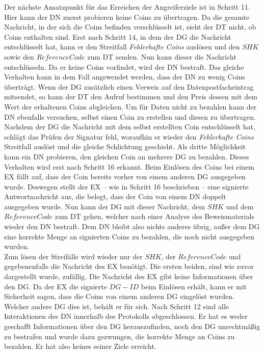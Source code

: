 \documentclass[
	fontsize=11pt,
	headings=small,
	parskip=half,           %
	bibliography=totoc,
	numbers=noenddot,       %
	open=any,               %
]{scrreprt}
\begin{document}
Der nächste Ansatzpunkt für das Erreichen der Angreiferziele ist in Schritt 11. Hier kann der DN zuerst probieren keine Coins zu übertragen. Da die gesamte Nachricht, in der sich die Coins befinden verschlüsselt ist, sieht der DT nicht, ob Coins enthalten sind. Erst nach Schritt 14, in dem der DG die Nachricht entschlüsselt hat, kann er den Streitfall \textit{Fehlerhafte Coins} auslösen und den $SHK$ sowie den $ReferenceCode$ zum DT senden. Nun kann dieser die Nachricht entschlüsseln. Da er keine Coins vorfindet, wird der DN bestraft. Das gleiche Verhalten kann in dem Fall angewendet werden, dass der DN zu wenig Coins überträgt. Wenn der DG zusätzlich einen Verweis auf den Datenpostfacheintrag mitsendet, so kann der DT den Aufruf bestimmen und den Preis dessen mit dem Wert der erhaltenen Coins abgleichen. Um für Daten nicht zu bezahlen kann der DN ebenfalls versuchen, selbst einen Coin zu erstellen und diesen zu übertragen. Nachdem der DG die Nachricht mit dem selbst erstellten Coin entschlüsselt hat, schlägt das Prüfen der Signatur fehl, woraufhin er wieder den \textit{Fehlerhafte Coins} Streitfall auslöst und die gleiche Schlichtung geschieht. Als dritte Möglichkeit kann ein DN probieren, den gleichen Coin an mehrere DG zu bezahlen. Dieses Verhalten wird erst nach Schritt 16 erkannt. Beim Einlösen des Coins bei einem EX fällt auf, dass der Coin bereits vorher von einem anderen DG ausgegeben wurde. Deswegen stellt der EX -- wie in Schritt 16 beschrieben -- eine signierte Antwortnachricht aus, die belegt, dass der Coin von einem DN doppelt ausgegeben wurde. Nun kann der DG mit dieser Nachricht, dem $SHK$ und dem $ReferenceCode$ zum DT gehen, welcher nach einer Analyse des Beweismaterials wieder den DN bestraft. Dem DN bleibt also nichts anderes übrig, außer dem DG eine korrekte Menge an signierten Coins zu bezahlen, die noch nicht ausgegeben wurden.\\

Zum lösen der Streifälle wird wieder nur der $SHK$, der $ReferenceCode$ und gegebenenfalls die Nachricht des EX benötigt. Die ersten beiden, sind wie zuvor dargestellt wurde, zufällig. Die Nachricht des EX gibt keine Informationen über den DG. Da der EX die signierte $DG-ID$ beim Einlösen erhält, kann er mit Sicherheit sagen, dass die Coins von einem anderen DG eingelöst wurden. Welcher andere DG dies ist, behält er für sich. Nach Schritt 12 sind alle Interaktionen des DN innerhalb des Protokolls abgeschlossen. Er hat es weder geschafft Informationen über den DG herauszufinden, noch den DG unrechtmäßig zu bestrafen und wurde dazu gezwungen, die korrekte Menge an Coins zu bezahlen. Er hat also keines seiner Ziele erreicht.
\end{document}
